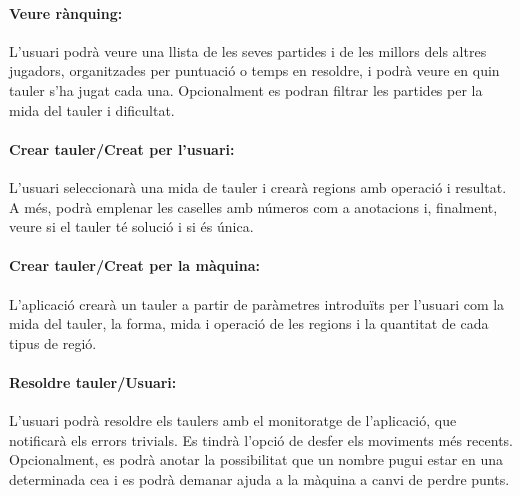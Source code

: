 \documentclass[a4paper,12pt]{article}
\begin{document}
\paragraph{Veure rànquing:} 
L'usuari podrà veure una llista de les seves partides i de les millors dels altres jugadors, organitzades per puntuació o temps en resoldre, i podrà veure en quin tauler s'ha jugat cada una. Opcionalment es podran filtrar les partides per la mida del tauler i dificultat. 

\paragraph{Crear tauler/Creat per l'usuari:}
L'usuari seleccionarà una mida de tauler i crearà regions amb operació i resultat. A més, podrà emplenar les caselles amb números com a anotacions i, finalment, veure si el tauler té solució i si és única.


\paragraph{Crear tauler/Creat per la màquina:}
L'aplicació crearà un tauler a partir de paràmetres introduïts per l'usuari com la mida del tauler, la forma, mida i operació de les regions i la quantitat de cada tipus de regió.

\paragraph{Resoldre tauler/Usuari:}
L'usuari podrà resoldre els taulers amb el monitoratge de l'aplicació, que notificarà els errors trivials. Es tindrà l'opció de desfer els moviments més recents. Opcionalment, es podrà anotar la possibilitat que un nombre pugui estar en una determinada ce\lgem a i es podrà demanar ajuda a la màquina a canvi de perdre punts.

\newpage
\end{document}
